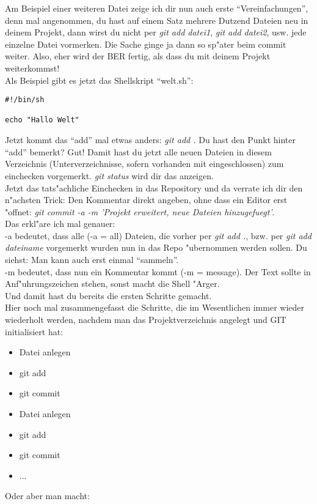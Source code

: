 \documentclass[german,a4paper]{report}
\begin{document}
Am Beispiel einer weiteren Datei zeige ich dir nun auch erste ``Vereinfachungen'', denn mal
angenommen, du hast auf einem Satz mehrere Dutzend Dateien neu in deinem Projekt, dann
wirst du nicht per \textit{git add datei1}, \textit{git add datei2}, usw. jede einzelne
Datei vormerken. Die Sache ginge ja dann so sp"ater beim commit weiter. Also, eher wird
der BER fertig, als dass du mit deinem Projekt weiterkommst!\\
Als Beispiel gibt es jetzt das Shellskript ``welt.sh'':
\begin{verbatim}
#!/bin/sh

echo "Hallo Welt"
\end{verbatim}
Jetzt kommt das ``add'' mal etwas anders: \textit{git add .} Du hast den Punkt hinter ``add''
bemerkt? Gut! Damit hast du jetzt alle neuen Dateien in diesem Verzeichnis (Unterverzeichnisse,
sofern vorhanden mit eingeschlossen) zum einchecken vorgemerkt. \textit{git status} wird
dir das anzeigen.\\
Jetzt das tats"achliche Einchecken in das Repository und da verrate ich dir den n"achsten
Trick: Den Kommentar direkt angeben, ohne dass ein Editor erst "offnet: \textit{git commit -a
-m 'Projekt erweitert, neue Dateien hinzugefuegt'}.\\
Das erkl"are ich mal genauer:\\
-a bedeutet, dass alle (-a = all) Dateien, die vorher per \textit{git add .}, bzw. per
\textit{git add dateiname} vorgemerkt wurden nun in das Repo "ubernommen werden sollen. Du siehst:
Man kann auch erst einmal ``sammeln''.\\
-m bedeutet, dass nun ein Kommentar kommt (-m = message). Der Text sollte in Anf"uhrungszeichen
stehen, sonst macht die Shell "Arger.\\
Und damit hast du bereits die ersten Schritte gemacht.\\
Hier noch mal zusammengefasst die Schritte, die im Wesentlichen immer wieder wiederholt
werden, nachdem man das Projektverzeichnis angelegt und GIT initialisiert hat:
\begin{itemize}
\item Datei anlegen
\item git add
\item git commit
\item Datei anlegen
\item git add
\item git commit
\item ...
\end{itemize}
Oder aber man macht:
\end{document}
